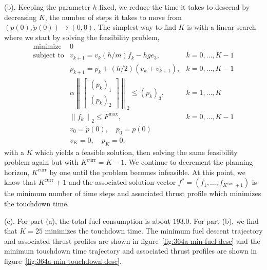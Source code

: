 \documentclass[12pt,reqno]{article}
\theoremstyle{definition}
\numberwithin{equation}{section}
\begin{document}
    \vspace{0.1cm}
    \noindent (b). Keeping the parameter $h$ fixed, we reduce the time it takes to descend by decreasing $K$,
    the number of steps it takes to move from $(p(0), \dot{p}(0)) \to (0, 0)$. The simplest way 
    to find $K$ is with a linear search where we start by solving the feasibility problem,
    \[\begin{array}{lll}
        \text{minimize} \; & 0 & \\
        \text{subject to} & v_{k+1} = v_k (h/m)f_k - hge_3, & k = 0, \ldots, K-1 \\
        & p_{k+1} = p_k + (h/2)(v_k + v_{k+1}), & k = 0, \ldots, K-1 \\
        & \alpha \left\lVert \begin{bmatrix} (p_k)_1 \\ (p_k)_2 \end{bmatrix} \right\rVert_{2} \le (p_k)_3, & k=1, \ldots, K \\
        & \left\lVert f_k \right\rVert_{2} \le F^{\mathrm{max}}, & k = 0, \ldots, K-1 \\
        & v_{0} = \dot{p}(0), \quad p_0 = p(0) & \\
        & v_{K} = 0, \quad p_{K} = 0,
        \end{array}\]
    with a $K$ which yields a feasible solution, then solving the same feasibility problem again but
    with $K^{\mathrm{curr}} = K-1$. We continue to decrement the planning horizon, $K^{\mathrm{curr}}$ by one until the problem becomes infeasible.
    At this point, we know that $K^{\mathrm{curr}} + 1$ and the associated solution vector $f^{*} = (f_1, \ldots, f_{K^{curr}+1})$ 
    is the minimum number of time steps and associated thrust profile which minimizes the touchdown time.

    \vspace{0.1cm}
    \noindent (c). For part (a), the total fuel consumption is about $193.0$. For part (b),
    we find that $K=25$ minimizes the touchdown time. The minimum fuel descent trajectory
    and associated thrust profiles are shown in figure~\ref{fig:364a-min-fuel-desc}
    and the minimum touchdown time trajectory and associated thrust profiles are shown in figure~\ref{fig:364a-min-touchdown-desc}.
\end{document}
